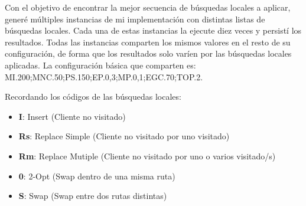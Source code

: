 \bigskip

Con el objetivo de encontrar la mejor secuencia de búsquedas locales a aplicar, generé múltiples instancias de mi implementación con distintas listas de búsquedas locales. Cada una de estas instancias la ejecute diez veces y persistí los resultados. Todas las instancias comparten los mismos valores en el resto de su configuración, de forma que los resultados solo varíen por las búsquedas locales aplicadas. La configuración básica que comparten es: MI.200;MNC.50;PS.150;EP.0,3;MP.0,1;EGC.70;TOP.2.

\bigskip

Recordando los códigos de las búsquedas locales: 
\begin{itemize}
  \item \textbf{I}: Insert (Cliente no visitado)
  \item \textbf{Rs}: Replace Simple (Cliente no visitado por uno visitado)
  \item \textbf{Rm}: Replace Mutiple (Cliente no visitado por uno o varios visitado/s)
  \item \textbf{0}: 2-Opt (Swap dentro de una misma ruta)
  \item \textbf{S}: Swap (Swap entre dos rutas distintas)
\end{itemize}

\bigskip

